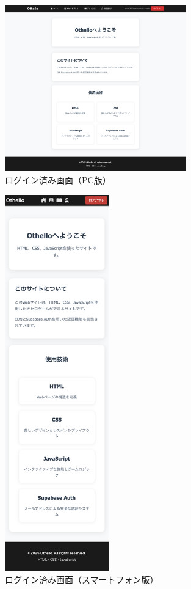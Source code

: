 \documentclass[10pt, a4paper]{jsarticle}
\begin{document}
\begin{figure}[H]
\centering
\includegraphics[width=0.7\textwidth]{img/loggedin-pc.png}
\caption{ログイン済み画面（PC版）}
\label{fig:loggedin-pc}
\end{figure}

\begin{figure}[H]
\centering
\includegraphics[width=0.4\textwidth]{img/loggedin-phone.png}
\caption{ログイン済み画面（スマートフォン版）}
\label{fig:loggedin-phone}
\end{figure}
\end{document}
